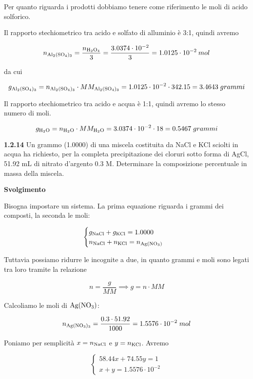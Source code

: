 Per quanto riguarda i prodotti dobbiamo tenere come riferimento le moli di acido solforico.

Il rapporto stechiometrico tra acido e solfato di alluminio è 3:1, quindi avremo

$$n_{\rm Al_2(SO_4)_3}=\frac{n_{\rm H_2O_4}}{3}
=\frac{3.0374 \cdot 10^{-2}}{3}
=1.0125 \cdot 10^{-2}\:mol$$

da cui

$$g_{\rm Al_2(SO_4)_3}=n_{\rm Al_2(SO_4)_3} \cdot MM_{\rm Al_2(SO_4)_3}
=1.0125 \cdot 10^{-2} \cdot 342.15
=3.4643\;grammi$$

Il rapporto stechiometrico tra acido e acqua è 1:1, quindi avremo lo stesso numero di moli.

$$g_{\rm H_2O}=n_{\rm H_2O} \cdot MM_{\rm H_2O}
=3.0374 \cdot 10^{-2} \cdot 18
=0.5467\;grammi$$

\vspace{0.2cm}\textbf{1.2.14} Un grammo (1.0000) di una miscela costituita da NaCl e KCl sciolti in acqua ha richiesto, per la completa precipitazione dei cloruri sotto forma di AgCl, 51.92 mL di nitrato d'argento 0.3 M. Determinare la composizione percentuale in massa della miscela.

\vspace{0.2cm}\large\textbf{Svolgimento}\normalsize

\vspace{0.2cm}Bisogna impostare un sistema. La prima equazione riguarda i grammi dei composti, la seconda le moli:

$$\begin{cases}
    g_{\rm NaCl} + g_{\rm KCl}=1.0000\\
    n_{\rm NaCl} + n_{\rm KCl}=n_{\rm Ag(NO_3)}
\end{cases}$$

Tuttavia possiamo ridurre le incognite a due, in quanto grammi e moli sono legati tra loro tramite la relazione

$$n=\frac{g}{MM}
\implies
g=n \cdot MM$$

Calcoliamo le moli di $\rm Ag(NO_3)$:

$$n_{\rm Ag(NO_3)_3}=\frac{0.3 \cdot 51.92}{1000}=1.5576 \cdot 10^{-2}\;mol$$

Poniamo per semplicità $x=n_{\rm NaCl}$ e $y=n_{\rm KCl}$. Avremo

$$\begin{cases}
    58.44x + 74.55y=1\\
    x+y=1.5576 \cdot 10^{-2}
\end{cases}$$

